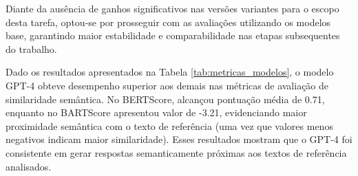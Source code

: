 Diante da ausência de ganhos significativos nas versões variantes para o escopo desta tarefa, optou-se por prosseguir com as avaliações utilizando os modelos base, garantindo maior estabilidade e comparabilidade nas etapas subsequentes do trabalho.



\begin{table}[h]
\centering
{}
\caption{Comparação de métricas entre modelos Base}
\label{tab:metricas_modelos}
\end{table}

Dado os resultados apresentados na Tabela \ref{tab:metricas_modelos}, o modelo GPT-4 obteve desempenho superior aos demais nas métricas de avaliação de similaridade semântica. No BERTScore, alcançou pontuação média de 0.71, enquanto no BARTScore apresentou valor de -3.21, evidenciando maior proximidade semântica com o texto de referência (uma vez que valores menos negativos indicam maior similaridade). Esses resultados mostram que o GPT-4 foi consistente em gerar respostas semanticamente próximas aos textos de referência analisados. 

